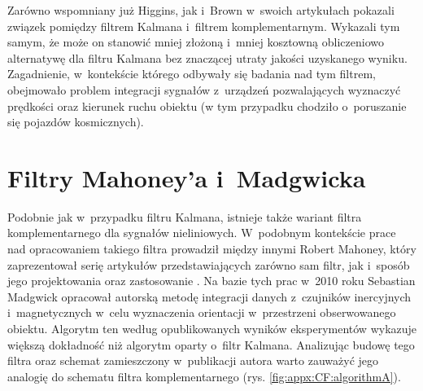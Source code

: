 Zarówno wspomniany już Higgins, jak i~Brown \cite{BROWN1972} w~swoich artykułach pokazali związek pomiędzy filtrem Kalmana i~filtrem komplementarnym. Wykazali tym samym, że może on stanowić mniej złożoną i~mniej kosztowną obliczeniowo alternatywę dla filtru Kalmana bez znaczącej utraty jakości uzyskanego wyniku. Zagadnienie, w~kontekście którego odbywały się badania nad tym filtrem, obejmowało problem integracji sygnałów z~urządzeń pozwalających wyznaczyć prędkości oraz kierunek ruchu obiektu (w tym przypadku chodziło o~poruszanie się pojazdów kosmicznych).
\section*{Filtry Mahoney'a i~Madgwicka}
Podobnie jak w~przypadku filtru Kalmana, istnieje także wariant filtra komplementarnego dla sygnałów nieliniowych. W~podobnym kontekście prace nad opracowaniem takiego filtra prowadził między innymi Robert Mahoney, który zaprezentował serię artykułów przedstawiających zarówno sam filtr, jak i~sposób jego projektowania oraz zastosowanie \cite{Baldwin2007,Mahony2005a,Mahony2008,Euston2008}. 
Na bazie tych prac w~2010 roku Sebastian Madgwick opracował autorską metodę \cite{Madgwick2010,Madgwick2011} integracji danych z~czujników inercyjnych i~magnetycznych w~celu wyznaczenia orientacji w~przestrzeni obserwowanego obiektu. Algorytm ten według opublikowanych wyników eksperymentów wykazuje większą dokładność niż algorytm oparty o~filtr Kalmana. Analizując budowę tego filtra oraz schemat zamieszczony w~publikacji autora warto zauważyć jego analogię do schematu filtra komplementarnego (rys. \ref{fig:appx:CF:algorithmA}).
				
					
							
%		
%		
%		
%		
%
